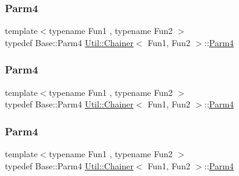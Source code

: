 \mbox{\label{classUtil_1_1Chainer_a82e756f3083e3883a05644425474f789}} 
\subsubsection{\texorpdfstring{Parm4}{Parm4}\hspace{0.1cm}{\footnotesize\ttfamily [1/3]}}
{\footnotesize\ttfamily template$<$typename Fun1 , typename Fun2 $>$ \\
typedef Base\+::\+Parm4 \mbox{\hyperlink{classUtil_1_1Chainer}{Util\+::\+Chainer}}$<$ Fun1, Fun2 $>$\+::\mbox{\hyperlink{classUtil_1_1Chainer_a82e756f3083e3883a05644425474f789}{Parm4}}}

\mbox{\label{classUtil_1_1Chainer_a82e756f3083e3883a05644425474f789}} 
\subsubsection{\texorpdfstring{Parm4}{Parm4}\hspace{0.1cm}{\footnotesize\ttfamily [2/3]}}
{\footnotesize\ttfamily template$<$typename Fun1 , typename Fun2 $>$ \\
typedef Base\+::\+Parm4 \mbox{\hyperlink{classUtil_1_1Chainer}{Util\+::\+Chainer}}$<$ Fun1, Fun2 $>$\+::\mbox{\hyperlink{classUtil_1_1Chainer_a82e756f3083e3883a05644425474f789}{Parm4}}}

\mbox{\label{classUtil_1_1Chainer_a82e756f3083e3883a05644425474f789}} 
\subsubsection{\texorpdfstring{Parm4}{Parm4}\hspace{0.1cm}{\footnotesize\ttfamily [3/3]}}
{\footnotesize\ttfamily template$<$typename Fun1 , typename Fun2 $>$ \\
typedef Base\+::\+Parm4 \mbox{\hyperlink{classUtil_1_1Chainer}{Util\+::\+Chainer}}$<$ Fun1, Fun2 $>$\+::\mbox{\hyperlink{classUtil_1_1Chainer_a82e756f3083e3883a05644425474f789}{Parm4}}}

